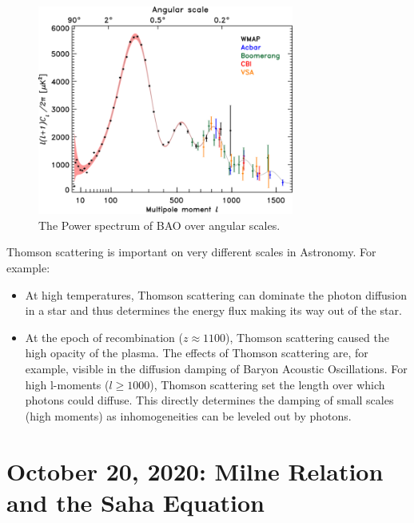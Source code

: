 \documentclass{article}
\begin{document}
\begin{figure}
    \centering
    \includegraphics[width=0.75\textwidth]{736px-BAO.png}
    \caption{The Power spectrum of BAO over angular scales.}
    \label{fig:BAO}
\end{figure}

Thomson scattering is important on very different scales in Astronomy. For example:

\begin{itemize}
    \item At high temperatures, Thomson scattering can dominate the photon diffusion in a star and thus determines the energy flux making its way out of the star.
    \item At the epoch of recombination ($z \approx 1100$), Thomson scattering caused the high opacity of the plasma. The effects of Thomson scattering are, for example, visible in the diffusion damping of Baryon Acoustic Oscillations. For high l-moments ($l\geq 1000$), Thomson scattering set the length over which photons could diffuse. This directly determines the damping of small scales (high moments) as inhomogeneities can be leveled out by photons.

\end{itemize}


\newpage
\section{October 20, 2020: Milne Relation and the Saha Equation}
\end{document}
